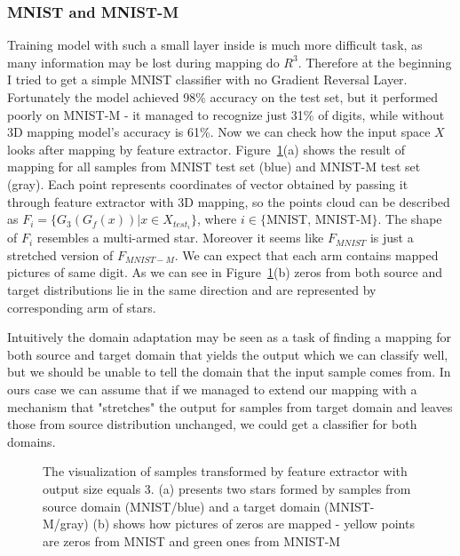 \documentclass{article}
\begin{document}
\subsubsection{MNIST and MNIST-M}
\par
Training model with such a small layer inside is much more difficult task, as many information may be lost during mapping do ${R}^{3}$. Therefore at the beginning I tried to get a simple MNIST classifier with no Gradient Reversal Layer. Fortunately the model achieved 98\% accuracy on the test set, but it performed poorly on MNIST-M - it managed to recognize just 31\% of digits, while without 3D mapping model's accuracy is 61\%. Now we can check how the input space ${X}$ looks after mapping by feature extractor. Figure~\ref{fig:MNIST_3D}(a) shows the result of mapping for all samples from MNIST test set (blue) and MNIST-M test set (gray). Each point represents coordinates of vector obtained by passing it through feature extractor with 3D mapping, so the points cloud can be described as $F_{i} = \{G_{3}(G_{f}(x)) | x \in X_{test_{i}}\}$, where $i \in \{$MNIST, MNIST-M$\}$. The shape of ${F_{i}}$ resembles a multi-armed star. Moreover it seems like $F_{MNIST}$ is just a stretched version of $F_{MNIST-M}$. We can expect that each arm contains mapped pictures of same digit. As we can see in Figure~\ref{fig:MNIST_3D}(b) zeros from both source and target distributions lie in the same direction and are represented by corresponding arm of stars. \par
Intuitively the domain adaptation may be seen as a task of finding a mapping for both source and target domain that yields the output which we can classify well, but we should be unable to tell the domain that the input sample comes from. In ours case we can assume that if we managed to extend our mapping with a mechanism that "stretches" the output for samples from target domain and leaves those from source distribution unchanged, we could get a classifier for both domains.

\begin{figure}[htb]%
    \centering
    \qquad
    \caption{The visualization of samples transformed by feature extractor with output size equals 3. (a) presents two stars formed by samples from source domain (MNIST/blue) and a target domain (MNIST-M/gray) (b) shows how pictures of zeros are mapped - yellow points are zeros from MNIST and green ones from MNIST-M}%
    \label{fig:MNIST_3D}%
\end{figure}
\end{document}
